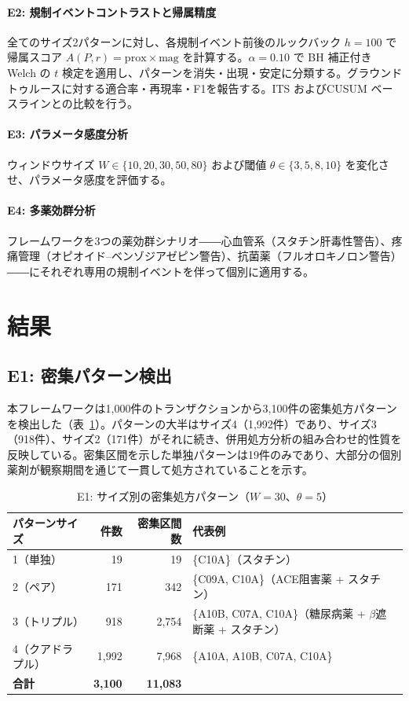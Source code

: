 \documentclass[11pt]{article}
\begin{document}
\paragraph{E2: 規制イベントコントラストと帰属精度}
全てのサイズ2パターンに対し、各規制イベント前後のルックバック $h = 100$ で帰属スコア $A(P, r) = \mathrm{prox} \times \mathrm{mag}$ を計算する。$\alpha = 0.10$ で BH 補正付き Welch の $t$ 検定を適用し、パターンを消失・出現・安定に分類する。グラウンドトゥルースに対する適合率・再現率・F1を報告する。ITS およびCUSUM ベースラインとの比較を行う。

\paragraph{E3: パラメータ感度分析}
ウィンドウサイズ $W \in \{10, 20, 30, 50, 80\}$ および閾値 $\theta \in \{3, 5, 8, 10\}$ を変化させ、パラメータ感度を評価する。

\paragraph{E4: 多薬効群分析}
フレームワークを3つの薬効群シナリオ――心血管系（スタチン肝毒性警告）、疼痛管理（オピオイド--ベンゾジアゼピン警告）、抗菌薬（フルオロキノロン警告）――にそれぞれ専用の規制イベントを伴って個別に適用する。

\section{結果}\label{sec:results}

\subsection{E1: 密集パターン検出}

本フレームワークは1{,}000件のトランザクションから3{,}100件の密集処方パターンを検出した（表~\ref{tab:e1}）。パターンの大半はサイズ4（1{,}992件）であり、サイズ3（918件）、サイズ2（171件）がそれに続き、併用処方分析の組み合わせ的性質を反映している。密集区間を示した単独パターンは19件のみであり、大部分の個別薬剤が観察期間を通じて一貫して処方されていることを示す。

\begin{table}[htbp]
\centering
\caption{E1: サイズ別の密集処方パターン（$W = 30$、$\theta = 5$）}
\label{tab:e1}
\begin{tabular}{@{}lrrl@{}}
\toprule
パターンサイズ & 件数 & 密集区間数 & 代表例 \\
\midrule
1（単独） & 19 & 19 & \{C10A\}（スタチン） \\
2（ペア） & 171 & 342 & \{C09A, C10A\}（ACE阻害薬 + スタチン） \\
3（トリプル） & 918 & 2{,}754 & \{A10B, C07A, C10A\}（糖尿病薬 + $\beta$遮断薬 + スタチン） \\
4（クアドラプル） & 1{,}992 & 7{,}968 & \{A10A, A10B, C07A, C10A\} \\
\midrule
\textbf{合計} & \textbf{3{,}100} & \textbf{11{,}083} & \\
\bottomrule
\end{tabular}
\end{table}
\end{document}
